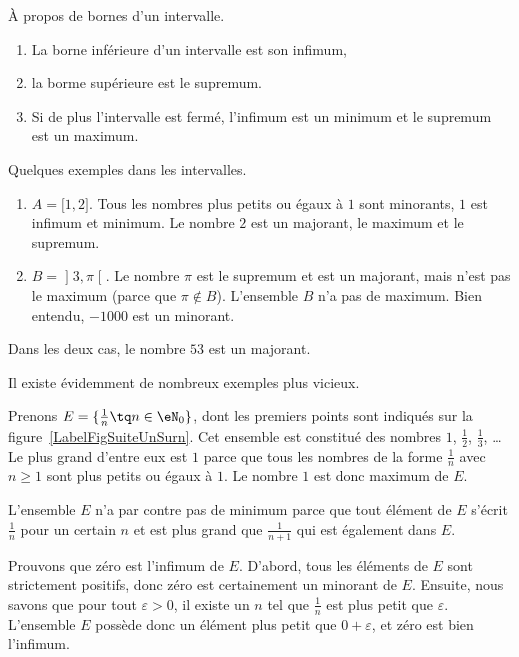 \begin{lemma}       \label{LEMooWCUXooFqTwDK}
    À propos de bornes d'un intervalle.
    \begin{enumerate}
        \item
	        La borne inférieure d'un intervalle est son infimum, 
        \item
            la borme supérieure est le supremum. 
        \item
            Si de plus l'intervalle est fermé, l'infimum est un minimum et le supremum est un maximum.
    \end{enumerate}
\end{lemma}


\begin{example}
    Quelques exemples dans les intervalles.
	\begin{enumerate}
		\item
			$A=\mathopen[ 1 , 2 \mathclose]$. Tous les nombres plus petits ou égaux à $1$ sont minorants, $1$ est infimum et minimum. Le nombre $2$ est un majorant, le maximum et le supremum.
		\item
			$B=\mathopen] 3 , \pi \mathclose[$. Le nombre $\pi$ est le supremum et est un majorant, mais n'est pas le maximum (parce que $\pi\notin B$). L'ensemble $B$ n'a pas de maximum. Bien entendu, $-1000$ est un minorant.
	\end{enumerate}
    Dans les deux cas, le nombre $53$ est un majorant.
\end{example}

Il existe évidemment de nombreux exemples plus vicieux.

\begin{example}
	Prenons $E=\{ \frac{1}{ n }\tq n\in\eN_0 \}$, dont les premiers points sont indiqués sur la figure~\ref{LabelFigSuiteUnSurn}. Cet ensemble est constitué des nombres $1$, $\frac{ 1 }{2}$, $\frac{1}{ 3 }$, \ldots Le plus grand d'entre eux est $1$ parce que tous les nombres de la forme $\frac{1}{ n }$ avec $n\geq 1$ sont plus petits ou égaux à $1$. Le nombre $1$ est donc maximum de $E$.

	L'ensemble $E$ n'a par contre pas de minimum parce que tout élément de $E$ s'écrit $\frac{1}{ n }$ pour un certain $n$ et est plus grand que $\frac{1}{ n+1 }$ qui est également dans $E$.

	Prouvons que zéro est l'infimum de $E$. D'abord, tous les éléments de $E$ sont strictement positifs, donc zéro est certainement un minorant de $E$. Ensuite, nous savons que pour tout $\varepsilon>0$, il existe un $n$ tel que $\frac{1}{ n }$ est plus petit que $\varepsilon$. L'ensemble $E$ possède donc un élément plus petit que $0+\varepsilon$, et zéro est bien l'infimum.
\end{example}

